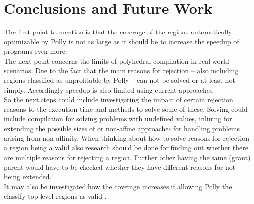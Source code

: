 \chapter{Conclusions and Future Work}
The first point to mention is that the coverage of the regions automatically optimizable by Polly is not as large as it should be to increase the speedup of programs even more.\\
The next point concerns the limits of polyhedral compilation in real world scenarios.
Due to the fact that the main reasons for rejection -- also including regions classified as unprofitable by Polly -- can not be solved or at least not simply.
Accordingly speedup is also limited using current approaches.\\
So the next steps could include investigating the impact of certain rejection reasons to the execution time and methods to solve some of these.
Solving could include \jit compilation for solving problems with undefined values, inlining for extending the possible sizes of \scops or non-affine approaches for handling problems arising from non-affinity.
When thinking about how to solve reasons for rejection a region being a valid \scop also research should be done for finding out whether there are multiple reasons for rejecting a region.
Further other \scops having the same (grant) parent would have to be checked whether they have different reasons for not being extended.\\
It may also be investigated how the coverage increases if allowing Polly the classify top level regions as valid \scops.\\
